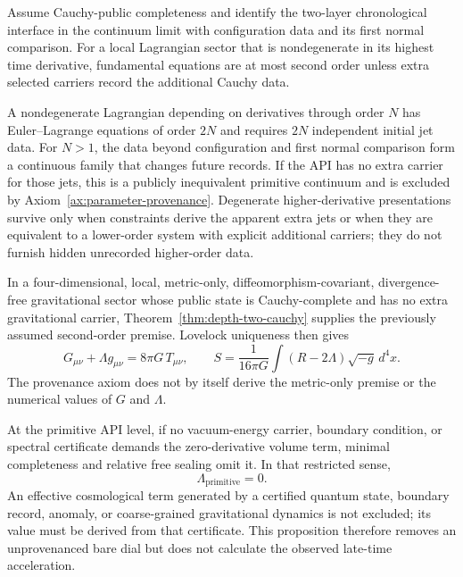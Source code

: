 \begin{theorem}
\label{thm:depth-two-cauchy}
Assume Cauchy-public completeness and identify the two-layer chronological interface
in the continuum limit with configuration data and its first normal comparison.
For a local Lagrangian sector that is nondegenerate in its highest time derivative,
fundamental equations are at most second order unless extra selected carriers record
the additional Cauchy data.
\end{theorem}

\begin{proofsketch}
A nondegenerate Lagrangian depending on derivatives through order \(N\) has
Euler--Lagrange equations of order \(2N\) and requires \(2N\) independent initial
jet data.  For \(N>1\), the data beyond configuration and first normal comparison
form a continuous family that changes future records.  If the API has no extra
carrier for those jets, this is a publicly inequivalent primitive continuum and is
excluded by Axiom~\ref{ax:parameter-provenance}.  Degenerate higher-derivative
presentations survive only when constraints derive the apparent extra jets or when
they are equivalent to a lower-order system with explicit additional carriers; they
do not furnish hidden unrecorded higher-order data.
\end{proofsketch}

\begin{corollary}
\label{cor:eh-partial-closure}
In a four-dimensional, local, metric-only, diffeomorphism-covariant,
divergence-free gravitational sector whose public state is Cauchy-complete and has
no extra gravitational carrier, Theorem~\ref{thm:depth-two-cauchy} supplies the
previously assumed second-order premise.  Lovelock uniqueness then gives
\[
 G_{\mu\nu}+\Lambda g_{\mu\nu}=8\pi G\,T_{\mu\nu},
 \qquad
 S=\frac1{16\pi G}\int(R-2\Lambda)\sqrt{-g}\,d^4x .
\]
The provenance axiom does not by itself derive the metric-only premise or the
numerical values of \(G\) and \(\Lambda\).
\end{corollary}

\begin{proposition}
\label{prop:primitive-lambda}
At the primitive API level, if no vacuum-energy carrier, boundary condition, or
spectral certificate demands the zero-derivative volume term, minimal completeness
and relative free sealing omit it.  In that restricted sense,
\[
 \Lambda_{\mathrm{primitive}}=0.
\]
An effective cosmological term generated by a certified quantum state, boundary
record, anomaly, or coarse-grained gravitational dynamics is not excluded; its value
must be derived from that certificate.  This proposition therefore removes an
unprovenanced bare dial but does not calculate the observed late-time acceleration.
\end{proposition}

